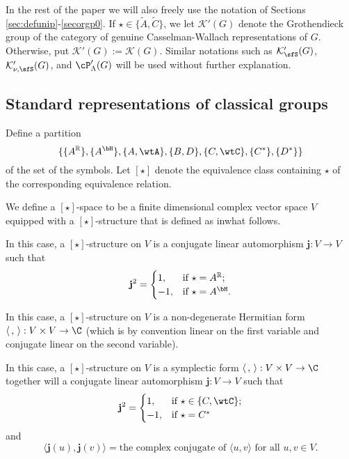 \documentclass[12pt,a4paper]{amsart}
\newcommand{\BH}{{\mathbb {H}}}
\newcommand{\CK}{{\mathcal {K}}}
\newcommand{\R}{\mathbb R}
\newcommand{\la}{\langle}
\newcommand{\ra}{\rangle}
\numberwithin{equation}{section}
\theoremstyle{remark}
\begin{document}
In the rest of the paper we will also freely use  the notation of Sections \ref{sec:defunip}-\ref{secorgp0}.
If $\star\in \{\widetilde A, \widetilde C\}$, we let $\CK'(G)$ denote the Grothendieck group of the category of genuine Casselman-Wallach representations of $G$. Otherwise, put $\CK'(G):=\CK(G)$. Similar notations such as $ \CK'_{\sfS}(G)$, $\CK'_{\nu,\sfS}(G)$, and $\cP'_\Lambda(G)$ will be used without further explanation.


\subsection{Standard representations of  classical groups}

Define a partition
\[
\{\{A^\R\}, \{A^\bH\}, \{A, \wtA\}, \{B,D\}, \{C, \wtC\}, \{C^*\},\{D^*\} \}
\]
of the set of the symbols. Let $[\star]$ denote the equivalence class containing $\star$ of the corresponding equivalence relation.


We define a $[\star]$-space to be a   finite dimensional complex vector space $V$ equipped with a $[\star]$-structure that is defined as inwhat follows.

\noindent {\bf The case when $\star\in \set{A^\R, A^\BH}$.} In this case, a $[\star]$-structure on $V$ is a conjugate linear automorphism $\mathbf j: V\rightarrow V$ such
that
\[
  \mathbf j^2= \begin{cases}
  1,  &  \text{if $\star=A^\R$};\\
  -1,    &  \text{if $\star=A^\bH$}.
    \end{cases}
\]


 In this case, a $[\star]$-structure on $V$ is a non-degenerate Hermitian form
$\la\,,\,\ra: V\times V\rightarrow \C$ (which is by convention linear on the first variable and conjugate linear on the second variable).


 In this case, a $[\star]$-structure on $V$ is a symplectic form
$\la\,,\,\ra: V\times V\rightarrow \C$ together will a conjugate linear automorphism $\mathbf j: V\rightarrow V$ such
that
\[
  \mathbf j^2= \begin{cases}
  1,  &  \text{if $\star\in\{C, \wtC\}$};\\
  -1,    &  \text{if $\star=C^*$}
    \end{cases}
\]
 and
 \[
   \la \mathbf j(u), \mathbf j(v)\ra =\textrm{the complex conjugate of  $\la u, v\ra$ for all $u,v\in V$}.
 \]
\end{document}

